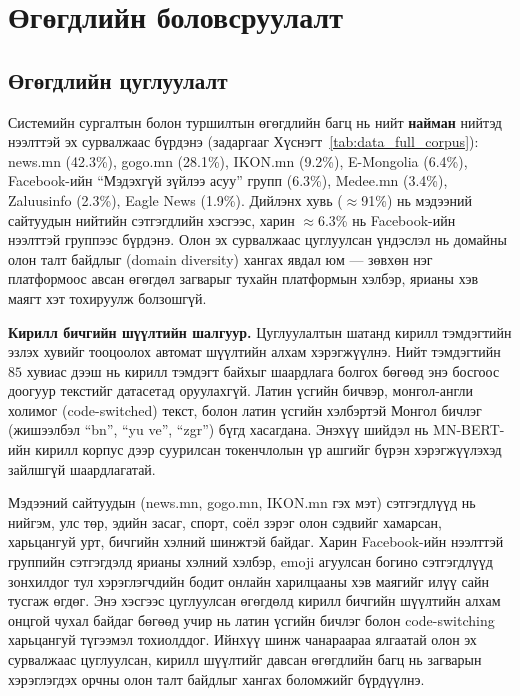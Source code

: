 ﻿%

\chapter{Өгөгдлийн боловсруулалт}
\label{Chapter4}

\section{Өгөгдлийн цуглуулалт}

Системийн сургалтын болон туршилтын өгөгдлийн багц нь нийт \textbf{найман}
нийтэд нээлттэй эх сурвалжаас бүрдэнэ (задаргааг Хүснэгт~\ref{tab:data_full_corpus}):
news.mn (42.3\%), gogo.mn (28.1\%), IKON.mn (9.2\%), E-Mongolia (6.4\%),
Facebook-ийн ``Мэдэхгүй зүйлээ асуу'' групп (6.3\%), Medee.mn (3.4\%),
Zaluusinfo (2.3\%), Eagle News (1.9\%). Дийлэнх хувь ($\approx$91\%) нь мэдээний
сайтуудын нийтийн сэтгэгдлийн хэсгээс, харин $\approx$6.3\% нь Facebook-ийн нээлттэй
группээс бүрдэнэ. Олон эх сурвалжаас цуглуулсан үндэслэл нь домайны олон талт
байдлыг (domain diversity) хангах явдал юм --- зөвхөн нэг платформоос авсан
өгөгдөл загварыг тухайн платформын хэлбэр, ярианы хэв маягт хэт тохируулж болзошгүй.

\textbf{Кирилл бичгийн шүүлтийн шалгуур.} Цуглуулалтын шатанд кирилл
тэмдэгтийн эзлэх хувийг тооцоолох автомат шүүлтийн алхам хэрэгжүүлнэ. Нийт
тэмдэгтийн $85$ хувиас дээш нь кирилл тэмдэгт байхыг шаардлага болгох бөгөөд
энэ босгоос доогуур текстийг датасетад оруулахгүй. Латин үсгийн бичвэр,
монгол-англи холимог (code-switched) текст, болон латин үсгийн хэлбэртэй Монгол бичлэг
(жишээлбэл ``bn'', ``yu ve'', ``zgr'') бүгд хасагдана. Энэхүү шийдэл нь
MN-BERT-ийн кирилл корпус дээр суурилсан токенчлолын үр ашгийг бүрэн
хэрэгжүүлэхэд зайлшгүй шаардлагатай.

Мэдээний сайтуудын (news.mn, gogo.mn, IKON.mn гэх мэт) сэтгэгдлүүд нь нийгэм,
улс төр, эдийн засаг, спорт, соёл зэрэг олон сэдвийг хамарсан, харьцангуй урт,
бичгийн хэлний шинжтэй байдаг. Харин Facebook-ийн нээлттэй группийн сэтгэгдэлд
ярианы хэлний хэлбэр, emoji агуулсан богино сэтгэгдлүүд зонхилдог тул
хэрэглэгчдийн бодит онлайн харилцааны хэв маягийг илүү сайн тусгаж өгдөг.
Энэ хэсгээс цуглуулсан өгөгдөлд кирилл бичгийн шүүлтийн алхам онцгой чухал
байдаг бөгөөд учир нь латин үсгийн бичлэг болон code-switching харьцангуй
түгээмэл тохиолддог. Ийнхүү шинж чанараараа ялгаатай олон эх сурвалжаас
цуглуулсан, кирилл шүүлтийг давсан өгөгдлийн багц нь загварын хэрэглэгдэх
орчны олон талт байдлыг хангах боломжийг бүрдүүлнэ.

